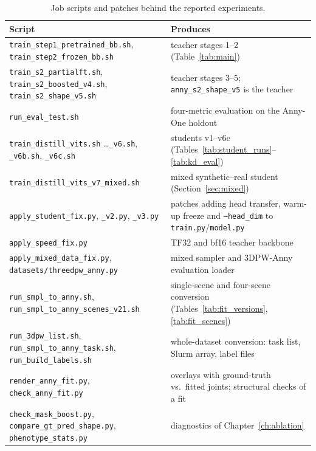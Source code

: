 
\begin{table}[h]
\centering\small
\begin{tabular}{p{4.6cm}p{8.6cm}}
\toprule
Script & Produces \\
\midrule
\texttt{train\_step1\_pretrained\_bb.sh}, \texttt{train\_step2\_frozen\_bb.sh} & teacher stages 1--2 (Table~\ref{tab:main}) \\
\texttt{train\_s2\_partialft.sh}, \texttt{train\_s2\_boosted\_v4.sh}, \texttt{train\_s2\_shape\_v5.sh} & teacher stages 3--5; \texttt{anny\_s2\_shape\_v5} is the teacher \\
\texttt{run\_eval\_test.sh} & four-metric evaluation on the Anny-One holdout \\
\texttt{train\_distill\_vits.sh} \ldots \texttt{\_v6.sh}, \texttt{\_v6b.sh}, \texttt{\_v6c.sh} & students v1--v6c (Tables~\ref{tab:student_runs}--\ref{tab:kd_eval}) \\
\texttt{train\_distill\_vits\_v7\_mixed.sh} & mixed synthetic--real student (Section~\ref{sec:mixed}) \\
\texttt{apply\_student\_fix.py}, \texttt{\_v2.py}, \texttt{\_v3.py} & patches adding head transfer, warm-up freeze and \texttt{--head\_dim} to \texttt{train.py}/\texttt{model.py} \\
\texttt{apply\_speed\_fix.py} & TF32 and bf16 teacher backbone \\
\texttt{apply\_mixed\_data\_fix.py}, \texttt{datasets/threedpw\_anny.py} & mixed sampler and 3DPW-Anny evaluation loader \\
\texttt{run\_smpl\_to\_anny.sh}, \texttt{run\_smpl\_to\_anny\_scenes\_v21.sh} & single-scene and four-scene conversion (Tables~\ref{tab:fit_versions}, \ref{tab:fit_scenes}) \\
\texttt{run\_3dpw\_list.sh}, \texttt{run\_smpl\_to\_anny\_task.sh}, \texttt{run\_build\_labels.sh} & whole-dataset conversion: task list, Slurm array, label files \\
\texttt{render\_anny\_fit.py}, \texttt{check\_anny\_fit.py} & overlays with ground-truth vs.\ fitted joints; structural checks of a fit \\
\texttt{check\_mask\_boost.py}, \texttt{compare\_gt\_pred\_shape.py}, \texttt{phenotype\_stats.py} & diagnostics of Chapter~\ref{ch:ablation} \\
\bottomrule
\end{tabular}
\caption{Job scripts and patches behind the reported experiments.}
\label{tab:scripts}
\end{table}
